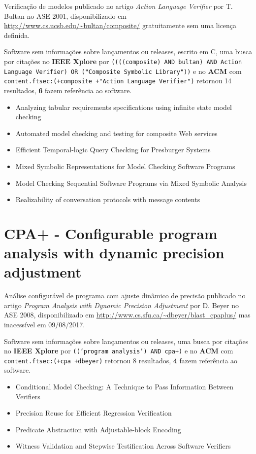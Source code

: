 Verificação de modelos
publicado no artigo {\it Action Language Verifier}
por T. Bultan
no ASE 2001,
disponibilizado em \url{http://www.cs.ucsb.edu/~bultan/composite/}
gratuitamente
sem uma licença definida.

Software sem informações sobre lançamentos ou releases,
escrito em C,
uma busca por citações no {\bf IEEE Xplore} por
\texttt{((((composite) AND bultan) AND Action Language Verifier) OR ("Composite Symbolic Library"))}
e no {\bf ACM} com
\texttt{content.ftsec:(+composite +"Action Language Verifier")}
retornou
14 resultados,
{\bf 6} fazem referência ao software.

\begin{itemize}
\item Analyzing tabular requirements specifications using infinite state model checking
\item Automated model checking and testing for composite Web services
\item Efficient Temporal-logic Query Checking for Presburger Systems
\item Mixed Symbolic Representations for Model Checking Software Programs
\item Model Checking Sequential Software Programs via Mixed Symbolic Analysis
\item Realizability of conversation protocols with message contents
\end{itemize}

\section{CPA+ - Configurable program analysis with dynamic precision adjustment}

Análise configurável de programa com ajuste dinâmico de precisão
publicado no artigo {\it Program Analysis with Dynamic Precision Adjustment}
por D. Beyer
no ASE 2008,
disponibilizado em \url{http://www.cs.sfu.ca/~dbeyer/blast_cpaplus/}
mas inacessível em 09/08/2017.

Software sem informações sobre lançamentos ou releases,
uma busca por citações no {\bf IEEE Xplore} por
\texttt{(('program analysis') AND cpa+)}
e no {\bf ACM} com
\texttt{content.ftsec:(+cpa +dbeyer)}
retornou
8 resultados,
{\bf 4} fazem referência ao software.

\begin{itemize}
\item Conditional Model Checking: A Technique to Pass Information Between Verifiers
\item Precision Reuse for Efficient Regression Verification
\item Predicate Abstraction with Adjustable-block Encoding
\item Witness Validation and Stepwise Testification Across Software Verifiers
\end{itemize}

